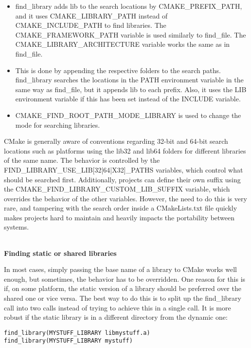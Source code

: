 \begin{itemize}
\item 
find\_library adds lib to the search locations by CMAKE\_PREFIX\_PATH, and it uses CMAKE\_LIBRARY\_PATH instead of CMAKE\_INCLUDE\_PATH to find libraries. The CMAKE\_FRAMEWORK\_PATH variable is used similarly to find\_file. The CMAKE\_LIBRARY\_ARCHITECTURE variable works the same as in find\_file.

\item 
This is done by appending the respective folders to the search paths. find\_library searches the locations in the PATH environment variable in the same way as find\_file, but it appends lib to each prefix. Also, it uses the LIB environment variable if this has been set instead of the INCLUDE variable.

\item 
CMAKE\_FIND\_ROOT\_PATH\_MODE\_LIBRARY is used to change the mode for searching libraries.
\end{itemize}

CMake is generally aware of conventions regarding 32-bit and 64-bit search locations such as platforms using the lib32 and lib64 folders for different libraries of the same name. The behavior is controlled by the FIND\_LIBRARY\_USE\_LIB[32|64|X32]\_PATHS variables, which control what should be searched first. Additionally, projects can define their own suffix using the CMAKE\_FIND\_LIBRARY\_CUSTOM\_LIB\_SUFFIX variable, which overrides the behavior of the other variables. However, the need to do this is very rare, and tampering with the search order inside a CMakeLists.txt file quickly makes projects hard to maintain and heavily impacts the portability between systems.

\hspace*{\fill} \\ %
\noindent
\textbf{Finding static or shared libraries}

In most cases, simply passing the base name of a library to CMake works well enough, but sometimes, the behavior has to be overridden. One reason for this is if, on some platform, the static version of a library should be preferred over the shared one or vice versa. The best way to do this is to split up the find\_library call into two calls instead of trying to achieve this in a single call. It is more robust if the static library is in a different directory from the dynamic one:

\begin{lstlisting}[style=styleCMake]
find_library(MYSTUFF_LIBRARY libmystuff.a)
find_library(MYSTUFF_LIBRARY mystuff)
\end{lstlisting}

